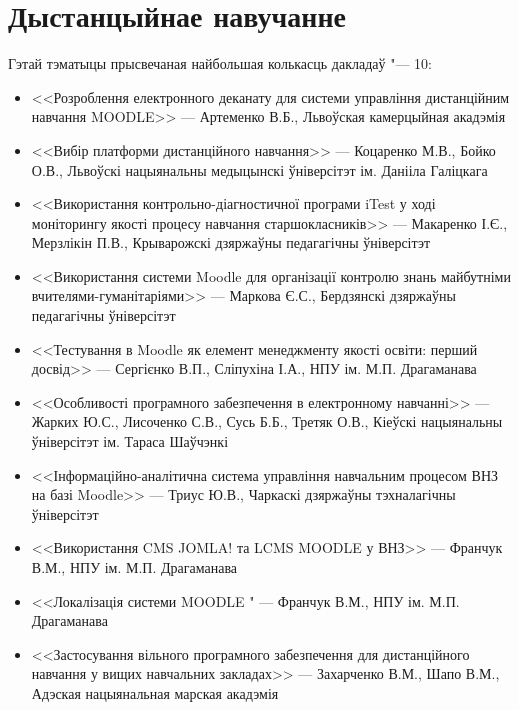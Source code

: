 \documentclass[10pt, a5paper]{article}
\begin{document}
\section*{Дыстанцыйнае навучанне}
Гэтай тэматыцы прысвечаная найбольшая колькасць дакладаў "--- 10:
\begin{itemize}
\item <<Розроблення електронного деканату для системи управління дистанційним навчання MOODLE>> --- Артеменко В.Б., Львоўская камерцыйная акадэмія
\item <<Вибір платформи дистанційного навчання>> --- Коцаренко М.В., Бойко О.В.,  Львоўскі нацыянальны медыцынскі ўніверсітэт ім. Данііла Галіцкага
\item <<Використання контрольно-діагностичної програми iTest у ході моніторингу якості процесу навчання старшокласників>> --- Макаренко І.Є., Мерзлікін П.В., Крыварожскі дзяржаўны педагагічны ўніверсітэт
\item  <<Використання системи Moodle для організації контролю знань майбутніми вчителями-гуманітаріями>> --- Маркова Є.С., Бердзянскі дзяржаўны педагагічны ўніверсітэт
\item  <<Тестування в  Moodle як елемент менеджменту якості освіти: перший досвід>> --- Сергієнко В.П., Сліпухіна І.А., НПУ ім. М.П. Драгаманава
\item  <<Особливості програмного забезпечення в електронному навчанні>> --- Жарких Ю.С., Лисоченко С.В., Сусь Б.Б., Третяк О.В., Кіеўскі нацыянальны ўніверсітэт ім. Тараса Шаўчэнкі
\item  <<Інформаційно-аналітична система управління навчальним процесом ВНЗ на базі  Moodle>> --- Триус Ю.В., Чаркаскі дзяржаўны тэхналагічны ўніверсітэт
\item  <<Використання CMS JOMLA!  та LCMS MOODLE у ВНЗ>> --- Франчук В.М., НПУ ім. М.П. Драгаманава
\item <<Локалізація системи MOODLE " --- Франчук В.М., НПУ ім. М.П. Драгаманава
\item  <<Застосування вільного програмного забезпечення для дистанційного навчання у вищих навчальних закладах>> --- Захарченко В.М., Шапо В.М., Адэская нацыянальная марская акадэмія
\end{itemize}
\newpage
\end{document}
